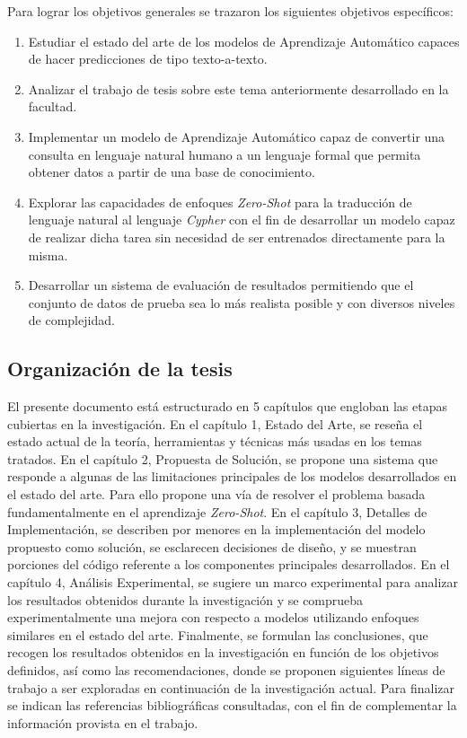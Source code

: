 Para lograr los objetivos generales se trazaron los siguientes objetivos específicos:

\begin{enumerate}
	\item Estudiar el estado del arte de los modelos de Aprendizaje Automático capaces de hacer predicciones de tipo texto-a-texto.
	\item Analizar el trabajo de tesis sobre este tema anteriormente desarrollado en la facultad.
	\item Implementar un modelo de Aprendizaje Automático capaz de convertir una consulta en lenguaje natural humano a un lenguaje formal que permita obtener datos a partir de una 		base de conocimiento.
	\item Explorar las capacidades de enfoques \textit{Zero-Shot} para la traducción de lenguaje natural al lenguaje \textit{Cypher} con el fin de desarrollar un modelo capaz de realizar dicha tarea sin necesidad de ser entrenados directamente para la misma.
	\item Desarrollar un sistema de evaluación de resultados permitiendo que el conjunto de datos de prueba sea lo más realista posible y con diversos niveles de complejidad.
\end{enumerate}

\subsection*{Organización de la tesis}

El presente documento está estructurado en 5 capítulos que engloban las etapas cubiertas en la investigación. En el capítulo 1, Estado del Arte, se reseña el estado actual de la teoría, herramientas y técnicas más usadas en los temas tratados. En el capítulo 2, Propuesta de Solución, se propone una sistema que responde a algunas de las limitaciones principales de los modelos desarrollados en el estado del arte. Para ello propone una vía de resolver el problema basada fundamentalmente en el aprendizaje \textit{Zero-Shot}. En el capítulo 3, Detalles de Implementación, se describen por menores en la implementación del modelo propuesto como solución, se esclarecen decisiones de diseño, y se muestran porciones del código referente a los componentes principales desarrollados. En el capítulo 4, Análisis Experimental, se sugiere un marco experimental para analizar los resultados obtenidos durante la investigación y se comprueba experimentalmente una mejora con respecto a modelos utilizando enfoques similares en el estado del arte. Finalmente, se formulan las conclusiones, que recogen los resultados obtenidos en la investigación en función de los objetivos definidos, así como las recomendaciones, donde se proponen siguientes líneas de trabajo a ser exploradas en continuación de la investigación actual. Para finalizar se indican las referencias bibliográficas consultadas, con el fin de complementar la información provista en el trabajo.


